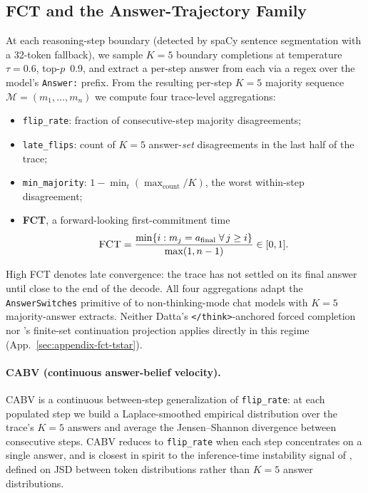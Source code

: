 \documentclass[11pt]{article}
\begin{document}
\subsection{FCT and the Answer-Trajectory Family}
\label{sec:methods-fct}

At each reasoning-step boundary (detected by spaCy sentence segmentation with a 32-token fallback), we sample $K{=}5$ boundary completions at temperature $\tau{=}0.6$, top-$p$~0.9, and extract a per-step answer from each via a regex over the model's \texttt{Answer:} prefix. From the resulting per-step $K{=}5$ majority sequence $\mathcal{M} = (m_1, \ldots, m_n)$ we compute four trace-level aggregations:
\begin{itemize}
\item \texttt{flip\_rate}: fraction of consecutive-step majority disagreements;
\item \texttt{late\_flips}: count of $K{=}5$ answer-\emph{set} disagreements in the last half of the trace;
\item \texttt{min\_majority}: $1 - \min_t (\max_{\text{count}}/K)$, the worst within-step disagreement;
\item \textbf{FCT}, a forward-looking first-commitment time
\begin{equation}
\textsc{FCT} = \frac{\min \{ i : m_j = a_{\text{final}} \;\forall\, j \geq i \}}{\max(1, n - 1)} \in [0, 1].
\label{eq:fct}
\end{equation}
\end{itemize}
\noindent High FCT denotes late convergence: the trace has not settled on its final answer until close to the end of the decode. All four aggregations adapt the \texttt{AnswerSwitches} primitive of \citet{datta_large_2026} to non-thinking-mode chat models with $K{=}5$ majority-answer extracts. Neither Datta's \texttt{</think>}-anchored forced completion nor \citeauthor{zhang_commit_2026}'s finite-set continuation projection applies directly in this regime (App.~\ref{sec:appendix-fct-tstar}).

\paragraph{CABV (continuous answer-belief velocity).} CABV is a continuous between-step generalization of \texttt{flip\_rate}: at each populated step we build a Laplace-smoothed empirical distribution over the trace's $K{=}5$ answers and average the Jensen--Shannon divergence between consecutive steps. CABV reduces to \texttt{flip\_rate} when each step concentrates on a single answer, and is closest in spirit to the inference-time instability signal of \citet{chen_i_2026}, defined on JSD between token distributions rather than $K{=}5$ answer distributions.
\end{document}
